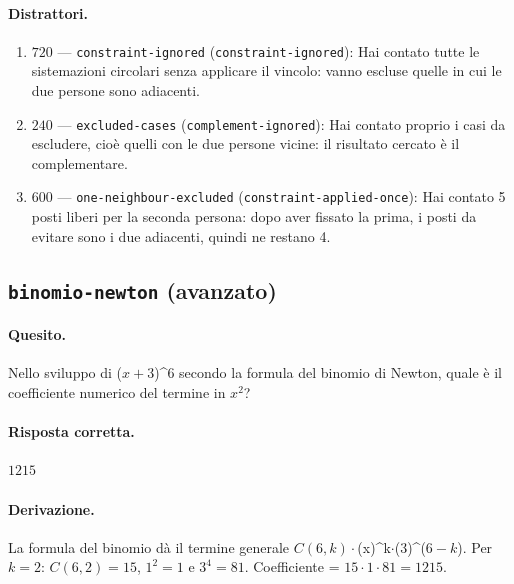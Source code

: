 \paragraph{Distrattori.}
\begin{enumerate}
  \item $720$ --- \texttt{constraint-ignored} (\texttt{constraint-ignored}): Hai contato tutte le sistemazioni circolari senza applicare il vincolo: vanno escluse quelle in cui le due persone sono adiacenti.
  \item $240$ --- \texttt{excluded-cases} (\texttt{complement-ignored}): Hai contato proprio i casi da escludere, cioè quelli con le due persone vicine: il risultato cercato è il complementare.
  \item $600$ --- \texttt{one-neighbour-excluded} (\texttt{constraint-applied-once}): Hai contato 5 posti liberi per la seconda persona: dopo aver fissato la prima, i posti da evitare sono i due adiacenti, quindi ne restano 4.
\end{enumerate}

\subsection{\texorpdfstring{\texttt{binomio-newton} (avanzato)}{binomio-newton (avanzato)}}

\paragraph{Quesito.} Nello sviluppo di ($x + 3$)\textasciicircum{}6 secondo la formula del binomio di Newton, quale è il coefficiente numerico del termine in $x^{2}$?

\paragraph{Risposta corretta.} $1215$

\paragraph{Derivazione.} La formula del binomio dà il termine generale $C(6,k)\cdot$(x)\textasciicircum{}k$\cdot$(3)\textasciicircum{}($6-k$). Per $k = 2$: $C(6,2) = 15$, $1^{2} = 1$ e $3^{4} = 81$. Coefficiente = $15 \cdot  1 \cdot  81 = 1215$.

